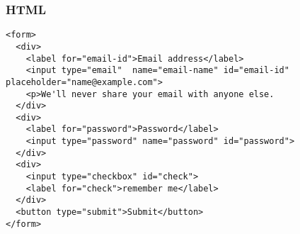 \begin{frame}[fragile]
\frametitle{HTML}
\begin{lstlisting}[style=htmlcssjs]
<form>
  <div>
    <label for="email-id">Email address</label>
    <input type="email"  name="email-name" id="email-id" placeholder="name@example.com">
    <p>We'll never share your email with anyone else.
  </div>
  <div>
    <label for="password">Password</label>
    <input type="password" name="password" id="password">
  </div>
  <div>
    <input type="checkbox" id="check">
    <label for="check">remember me</label>
  </div>
  <button type="submit">Submit</button>
</form>
\end{lstlisting}
\end{frame}
